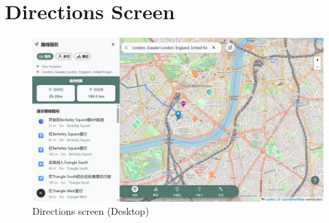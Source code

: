 \section{Directions Screen}
\begin{figure}[H]
    \centering
    \includegraphics[height=0.3\textheight,keepaspectratio]{images/Screenshots/4_directions_desktop.png}
    \caption{Directions screen (Desktop)}
\end{figure}

